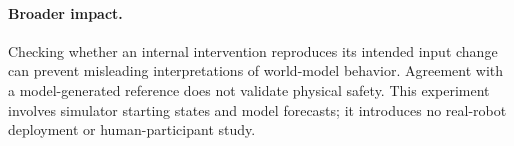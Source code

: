 \documentclass{article}
\begin{document}
\paragraph{Broader impact.}
Checking whether an internal intervention reproduces its intended input change can prevent misleading interpretations of world-model behavior. Agreement with a model-generated reference does not validate physical safety. This experiment involves simulator starting states and model forecasts; it introduces no real-robot deployment or human-participant study.
\clearpage

\end{document}
